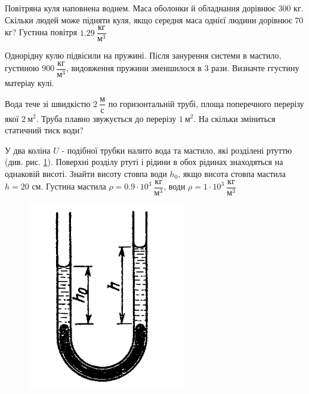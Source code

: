 \begin{problem}{11}
	Повітряна куля наповнена воднем. Маса оболонки й обладнання дорівнює $300$ кг. Скільки людей може підняти куля, якщо середня маса однієї людини дорівнює $70$ кг? Густина повітря $1.29~\dfrac{\text{кг}}{\text{м}^3}$
\end{problem}

\begin{problem}{12}
	Однорідну кулю підвісили на пружині. Після занурення системи в мастило, густиною $900 ~\dfrac{\text{кг}}{\text{м}^3}$, видовження пружини зменшилося в 3 рази. Визначте ггустину матеріау кулі.
\end{problem}

\begin{problem}{13}
	Вода тече зі швидкістю $2 ~\dfrac{\text{м}}{\text{с}}$ по горизонтальній трубі, площа поперечного перерізу якої $2 ~\text{м}^2$. Труба плавно звужується  до перерізу $1 ~\text{м}^2$. На скільки зміниться статичний тиск води?
\end{problem}

\begin{problem}{14}
	
	У два коліна $U$ - подібної трубки налито вода та мастило, які розділені ртуттю (див. рис. \ref{fig:koz197}). Поверхні розділу ртуті і рідини в обох рідинах знаходяться на однаковій висоті. Знайти висоту стовпа води $h_0$, якщо висота стовпа мастила $h = 20$ см. Густина мастила $\rho = 0.9\cdot 10^3 ~\dfrac{\text{кг}}{\text{м}^3}$, води $\rho = 1\cdot 10^3 ~\dfrac{\text{кг}}{\text{м}^3} $
	
	\begin{figure}[h!]
		\centering
		\includegraphics[width=0.2\linewidth]{class9/koz_197}
		\caption{}
		\label{fig:koz197}
	\end{figure}
	
\end{problem}